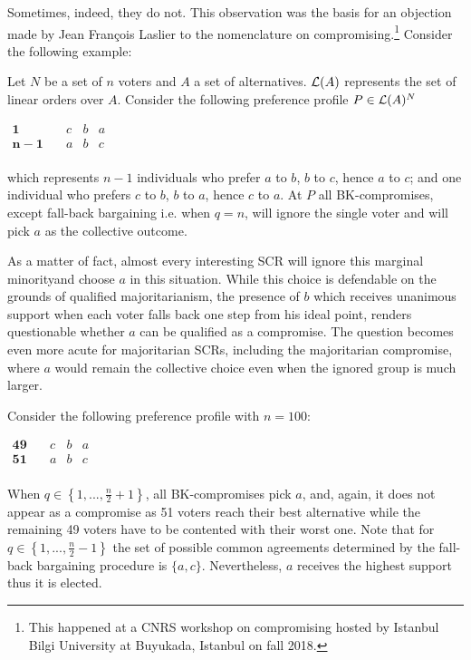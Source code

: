 \documentclass[version=3.21, pagesize, twoside=off, bibliography=totoc, DIV=calc, fontsize=12pt, a4paper]{scrartcl}
\begin{document}
Sometimes, indeed, they do not. This observation was the basis for an objection made by Jean Fran\c{c}ois Laslier to the nomenclature on compromising.\footnote{This happened at a CNRS workshop on compromising hosted by Istanbul Bilgi University at Buyukada, Istanbul on fall 2018.} Consider the following example:
\begin{example}
	\label{ex:ex1}
	Let $N$ be a set of $n$ voters and $A$ a set of alternatives. $\mathcal{L}(A)$ represents the set of linear orders over $A$. Consider the following preference profile $P\in \mathcal{L}(A)^{N}$
	\begin{center}
		$
		\begin{array}{cccc}
		\mathbf{1} \quad &c&b&a\\
		\mathbf{n-1} \quad &a&b&c\\
		\end{array}
		$
	\end{center}
	which represents $n-1$ individuals who prefer $a$ to $b$, $b$ to $c$, hence $a$ to $c$; and one individual who prefers $c$ to $b$, $b$ to $a$, hence $c$ to $a $. At $P$ all BK-compromises, except fall-back bargaining i.e. when $q=n$, will ignore the single voter and will pick $a$ as the collective outcome.
\end{example}

As a matter of fact, almost every interesting SCR will ignore this \oquot marginal minority\cquot and choose $a$ in this situation. While this choice is defendable on the grounds of qualified majoritarianism, the presence of $b$ which receives unanimous support when each voter falls back one step from his ideal point, renders questionable whether $a$ can be qualified as a compromise. The question becomes even more acute for majoritarian SCRs, including the majoritarian compromise, where $a$ would
remain the collective choice even when the ignored group is much larger.

\begin{example}
	\label{ex:ex2}
	Consider the following preference profile with $n=100$:
	\begin{center}
		$
		\begin{array}{cccc}
		\mathbf{49} \quad &c&b&a\\
		\mathbf{51} \quad &a&b&c\\
		\end{array}
		$
	\end{center}
	When $q\in \left\{ 1,..., \frac{n}{2} +1\right\} $, all BK-compromises pick $a$, and, again, it does not appear as a compromise as 51 voters reach their best alternative while the remaining 49 voters have to be contented with their worst one. Note that for $q\in \left\{ 1,..., \frac{n}{2} -1 \right\} $ the set of possible common agreements determined by the fall-back bargaining procedure is $\{a,c\}$. Nevertheless, $a$ receives the highest support thus it is elected.
\end{example}
\end{document}
